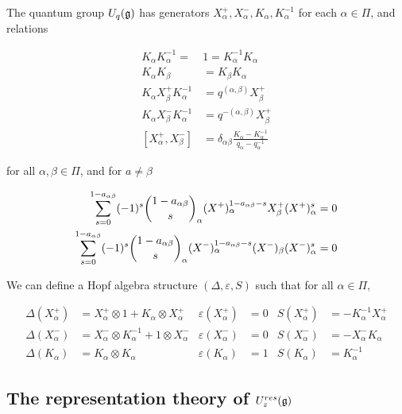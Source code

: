     \begin{defn}
    \label{UqgDef}
        The quantum group $U_q(\mathfrak{g})$ has generators
        $ X^+ _\alpha, X^-_\alpha, K_\alpha, K_\alpha^{-1}$ for each $\alpha \in
        \Pi$, and relations

        \begin{align}
            K_\alpha K_\alpha^{-1} =\ &1  = K_\alpha^{-1}K_\alpha \\
            K_\alpha K_\beta &= K_\beta K_\alpha \\
            K_\alpha  X^+ _\beta K_\alpha^{-1} &= q^{(\alpha, \beta)}  X^+ _\beta \\
            K_\alpha X^-_\beta K_\alpha^{-1} &= q^{-(\alpha, \beta)}  X^+ _\beta \\
            [ X^+ _\alpha, X^-_\beta] &= \delta_{\alpha\beta} \frac{K_\alpha - K_\alpha^{-1}}{ q_\alpha - q_\alpha^{-1}} 
        \end{align}

        for all $\alpha, \beta \in \Pi$, and for $a \neq \beta$

        \begin{align}
            \sum_{s=0}^{1-a_{\alpha\beta}} (-1)^s \dbinom{1-a_{\alpha\beta}}{s}_\alpha  (X^+)_\alpha^{1-a_{\alpha\beta} - s}  X^+_\beta  (X^+)_\alpha^s  &= 0 \\
            \sum_{s=0}^{1-a_{\alpha\beta}} (-1)^s \dbinom{1-a_{\alpha\beta}}{s}_\alpha (X^-)_\alpha^{1-a_{\alpha\beta} - s} (X^-)_\beta (X^-)_\alpha^s  &= 0 
        \end{align}
    \end{defn}

We can define a Hopf algebra structure $(\Delta, \varepsilon, S)$ such
that for all $\alpha \in \Pi$,

    \begin{align}
        \Delta( X^+ _\alpha) &=  X^+ _\alpha \otimes 1 + K_\alpha \otimes  X^+ _\alpha      & \varepsilon( X^+ _\alpha) &= 0  & S( X^+ _\alpha) &= -K_\alpha^{-1}  X^+ _\alpha \\
        \Delta(X^-_\alpha) &= X^-_\alpha \otimes K_\alpha^{-1} + 1 \otimes X^-_\alpha & \varepsilon(X^-_\alpha) &= 0  & S(X^-_\alpha) &= -X^-_\alpha K_\alpha \\
        \Delta(K_\alpha) &= K_\alpha \otimes K_\alpha                           & \varepsilon(K_\alpha) &= 1  & S(K_\alpha) &= K_\alpha^{-1}
    \end{align}


\subsection{The representation theory of $U_z^{res}(\mathfrak{g})$}

